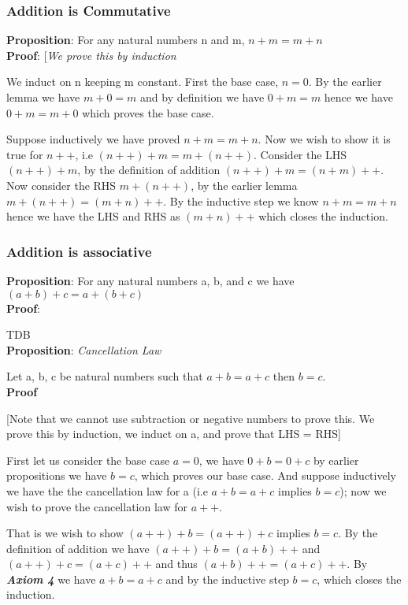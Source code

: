 \documentclass[10pt]{article}
\begin{document}
\subsubsection*{Addition is Commutative}
\textbf{Proposition}: For any natural numbers n and m, $ n + m = m + n $
\\[3pt]
\textbf{Proof}: [\emph{We prove this by induction}

  We induct on n keeping m constant. First the base case, $n = 0$. By the
  earlier lemma we have $m + 0 = m$ and by definition we have $0 + m =m$ hence
  we have $0 + m = m + 0$ which proves the base case.

  Suppose inductively we have proved $ n + m = m + n $. Now we wish to show it
  is true for $n++$, i.e $(n++) + m = m + (n++)$. Consider the LHS $(n++) + m$,
  by the definition of addition $(n++) + m = (n + m)++$. Now consider the RHS
  $m + (n++)$, by the earlier lemma $m + (n++) = (m + n)++$. By the inductive
  step we know $ n + m = m + n$ hence we have the LHS and RHS as $(m + n)++$
  which closes the induction.


\subsubsection*{Addition is associative}
\textbf{Proposition}: For any natural numbers a, b, and c we have $(a + b) + c =
a + (b + c)$
\\[3pt]
\textbf{Proof}:

TDB
\\[6pt]
\textbf{Proposition}: \emph{Cancellation Law}

Let a, b, c be natural numbers such that $a + b = a + c$ then $ b = c $.
\\[3pt]
\textbf{Proof}

[Note that we cannot use subtraction or negative numbers to prove this. We prove
  this by induction, we induct on a, and prove that LHS = RHS]

First let us consider the base case $a = 0$, we have $0 + b = 0 + c$ by earlier
propositions we have $ b = c $, which proves our base case. And suppose
inductively we have the the cancellation law for a (i.e $a + b = a + c$ implies
$b = c$); now we wish to prove the cancellation law for $a++$.

That is we wish to show $(a++) + b = (a++) + c$ implies $b = c$. By the
definition of addition we have $(a++) + b = (a + b)++$ and $(a++) + c = (a+c)++$
and thus $(a + b)++ = (a + c)++$. By \emph{\textbf{Axiom 4}} we have $a + b = a
+ c$ and by the inductive step $b = c$, which closes the induction.
\end{document}
